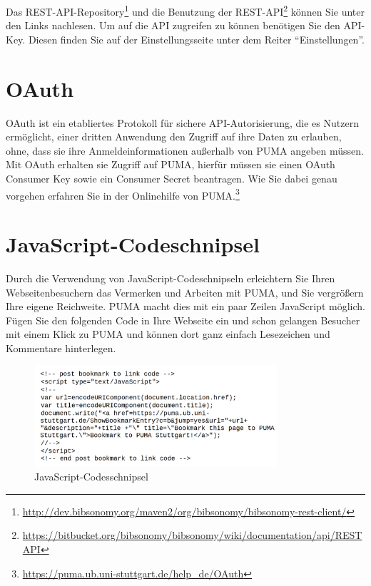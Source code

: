 Das REST-API-Repository\footnote{\url{http://dev.bibsonomy.org/maven2/org/bibsonomy/bibsonomy-rest-client/}} und die Benutzung der REST-API\footnote{\url{https://bitbucket.org/bibsonomy/bibsonomy/wiki/documentation/api/REST API}} können Sie unter den Links nachlesen.
\newline
Um auf die API zugreifen zu können benötigen Sie den API-Key. Diesen finden Sie auf der Einstellungsseite unter dem Reiter \enquote{Einstellungen}. 






\section{OAuth}
\label{sec:oAuth}
OAuth ist ein etabliertes Protokoll für sichere API-Autorisierung, die es Nutzern ermöglicht, einer dritten Anwendung den Zugriff auf ihre Daten zu erlauben, ohne, dass sie ihre Anmeldeinformationen außerhalb von PUMA angeben müssen. Mit OAuth erhalten sie Zugriff auf PUMA, hierfür müssen sie einen OAuth Consumer Key sowie ein Consumer Secret beantragen. Wie Sie dabei genau vorgehen erfahren Sie in der Onlinehilfe von PUMA.\footnote{\url{https://puma.ub.uni-stuttgart.de/help_de/OAuth}}



\section{JavaScript-Codeschnipsel}
\label{sec:javaScriptCode}
Durch die Verwendung von JavaScript-Codeschnipseln erleichtern Sie Ihren Webseitenbesuchern das Vermerken und Arbeiten mit PUMA, und Sie vergrößern Ihre eigene Reichweite. PUMA macht dies mit ein paar Zeilen JavaScript möglich. Fügen Sie den folgenden Code in Ihre Webseite ein und schon gelangen Besucher mit einem Klick zu PUMA und können dort ganz einfach Lesezeichen und Kommentare hinterlegen.
\begin{figure}[h!]
 \centering
 \includegraphics[width=9cm]{Bilder/Kapitel9/JavaScript_Codeschnipsel}
 \caption{JavaScript-Codesschnipsel}
 \label{fig:javascriptCode}
\end{figure}

